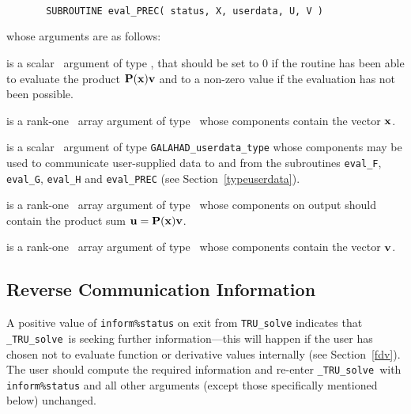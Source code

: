 \documentclass{galahad}
\newcommand{\packagename}{TRU}
\newcommand{\fullpackagename}{\libraryname\_\packagename}
\newcommand{\solver}{{\tt \fullpackagename\_solve}}
\begin{document}
\def\baselinestretch{0.8}
{\tt
\begin{verbatim}
       SUBROUTINE eval_PREC( status, X, userdata, U, V )
\end{verbatim} }
\def\baselinestretch{1.0}
\noindent whose arguments are as follows:

\begin{description}
 is a scalar \intentout\ argument of type \integer,
that should be set to 0 if the routine has been able to evaluate the
product ${\mathbf{P}}({\mathbf{x}}) {\mathbf{v}}$
and to a non-zero value if the evaluation has not been possible.

 is a rank-one \intentin\ array argument of type \realdp\
whose components contain the vector ${\mathbf{x}}$.

 is a scalar \intentinout\ argument of type
{\tt GALAHAD\_userdata\_type} whose components may be used
to communicate user-supplied data to and from the
subroutines {\tt eval\_F}, {\tt eval\_G},
{\tt eval\_H} and {\tt eval\_PREC}
(see Section~\ref{typeuserdata}).

 is a rank-one \intentout\ array argument of type \realdp\
whose components on output should contain the product
sum ${\mathbf{u}} = {\mathbf{P}}({\mathbf{x}}) {\mathbf{v}}$.

 is a rank-one \intentin\ array argument of type \realdp\
whose components contain the vector ${\mathbf{v}}$.

\end{description}


\subsection{\label{reverse}Reverse Communication Information}

A positive value of {\tt inform\%status} on exit from
{\tt \packagename\_solve}
indicates that
\solver\ is seeking further information---this will happen
if the user has chosen not to evaluate function or
derivative values internally (see Section~\ref{fdv}).
The user should compute the required information and re-enter \solver\
with {\tt inform\%status} and all other arguments (except those specifically
mentioned below) unchanged.
\end{document}
